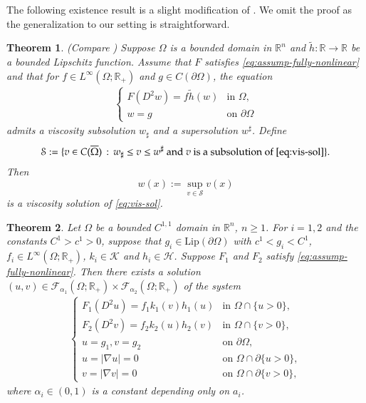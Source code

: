 \documentclass[11pt,oneside,english]{amsart}
\newcommand{\R}{{\mathbb R}}
\newcommand{\cS}{{\mathcal S}}
\newcommand{\cK}{{\mathcal K}}
\newcommand{\cH}{{\mathcal H}}
\newcommand{\cF}{{\mathcal F}}
\newcommand{\al}{\alpha}
\newcommand{\D}{\nabla}
\numberwithin{equation}{section}
\newtheorem{theorem}{Theorem}
\theoremstyle{plain}
\numberwithin{equation}{section}
\begin{document}
The following existence result is a slight modification of \cite[Theorem 2.1]{RicTei11}. We omit the proof as the generalization to our setting is straightforward.


\begin{theorem}(Compare \cite[Theorem 2.1]{RicTei11})
    \label{thm:exist-FN}
    Suppose $\Omega$ is a bounded domain in $\R^n$ and $\tilde h:\R\to\R$ be a bounded Lipschitz function. Assume that $F$ satisfies \eqref{eq:assump-fully-nonlinear} and that for $f\in L^\infty(\Omega;\R_+)$ and $g\in C(\partial\Omega)$, the equation 
    \begin{align}
        \label{eq:vis-sol}
        \begin{cases}
            F(D^2w)=f\tilde h(w)&\text{in }\Omega,\\
            w=g&\text{on }\partial\Omega
        \end{cases}
    \end{align}
    admits a viscosity subsolution $w_\sharp$ and a supersolution $w^\sharp$. Define
    \begin{align*}
        \mathcal{S}:=\{v\in C(\overline\Omega)\,:\, w_\sharp\le v\le w^\sharp\text{ and }v \text{ is a subsolution of }\eqref{eq:vis-sol}\}.
    \end{align*}
    Then 
    $$
    w(x):=\sup_{v\in \cS} v(x)
    $$
    is a viscosity solution of \eqref{eq:vis-sol}.
\end{theorem}



\begin{theorem}
    \label{thm:FN}
    Let $\Omega$ be a bounded $C^{1,1}$
      domain in $\R^n$, $n\ge1$. For $i=1,2$ and the constants $C^1>c^1>0$, suppose that $g_i\in \text{Lip}(\partial\Omega)$ with $c^1<g_i<C^1$, $f_i\in L^\infty(\Omega;\R_+)$,  $k_i\in \cK$ and $h_i\in \cH$. Suppose $F_1$ and $F_2$ satisfy \eqref{eq:assump-fully-nonlinear}. Then there exists a solution $(u,v)\in \cF_{\al_1}(\Omega;\R_+)\times  \cF_{\al_2}(\Omega;\R_+)$ of the system
    \begin{align}\label{system:fullynonlinear}
        \begin{cases}
            F_1(D^2u)=f_1k_1(v)h_1(u)&\text{in }\Omega\cap\{u>0\},\\
            F_2(D^2v)=f_2k_2(u)h_2(v)&\text{in }\Omega\cap\{v>0\},\\
            u=g_1,v=g_2&\text{on }\partial\Omega,\\
            u=|\D u|=0&\text{on }\Omega\cap\partial\{u>0\},\\
            v=|\D v|=0&\text{on }\Omega\cap\partial\{v>0\},
        \end{cases}
    \end{align}
    where $\al_i\in(0,1)$ is a constant depending only on $a_i$.
\end{theorem}
\end{document}
